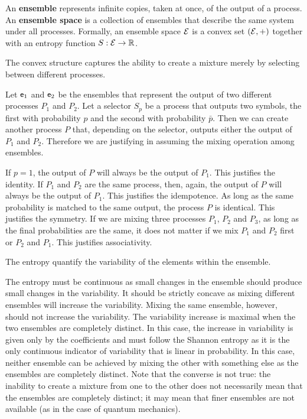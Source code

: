 \begin{defn}
	An \textbf{ensemble} represents infinite copies, taken at once, of the output of a process. An \textbf{ensemble space} is a collection of ensembles that describe the same system under all processes. Formally, an ensemble space $\mathcal{E}$ is a convex set $(\mathcal{E}, +)$ together with an entropy function $S : \mathcal{E} \to \mathbb{R}$.
\end{defn}
\begin{justification}
	
	The convex structure captures the ability to create a mixture merely by selecting between different processes.
	
	Let $\mathsf{e}_1$ and $\mathsf{e}_2$ be the ensembles that represent the output of two different processes $P_1$ and $P_2$. Let a selector $S_p$ be a process that outputs two symbols, the first with probability $p$ and the second with probability $\bar{p}$. Then we can create another process $P$ that, depending on the selector, outputs either the output of $P_1$ and $P_2$. Therefore we are justifying in assuming the mixing operation among ensembles.
	
	If $p=1$, the output of $P$ will always be the output of $P_1$. This justifies the identity. If $P_1$ and $P_2$ are the same process, then, again, the output of $P$ will always be the output of $P_1$. This justifies the idempotence. As long as the same probability is matched to the same output, the process $P$ is identical. This justifies the symmetry. If we are mixing three processes $P_1$, $P_2$ and $P_3$, as long as the final probabilities are the same, it does not matter if we mix $P_1$ and $P_2$ first or $P_2$ and $P_1$. This justifies associativity.
	
	The entropy quantify the variability of the elements within the ensemble.
	
	The entropy must be continuous as small changes in the ensemble should produce small changes in the variability. It should be strictly concave as mixing different ensembles will increase the variability. Mixing the same ensemble, however, should not increase the variability. The variability increase is maximal when the two ensembles are completely distinct. In this case, the increase in variability is given only by the coefficients and must follow the Shannon entropy as it is the only continuous indicator of variability that is linear in probability. In this case, neither ensemble can be achieved by mixing the other with something else as the ensembles are completely distinct. Note that the converse is not true: the inability to create a mixture from one to the other does not necessarily mean that the ensembles are completely distinct; it may mean that finer ensembles are not available (as in the case of quantum mechanics).
	
\end{justification}

